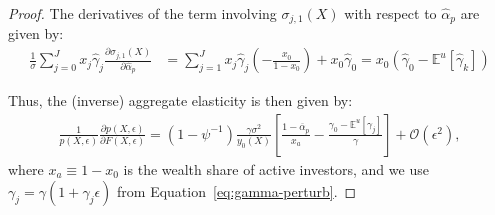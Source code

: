 \begin{proof}
The derivatives of the term involving $ \sigma_{j,1}(X) $ with respect to $ \hat{\alpha}_p $ are given by:
\begin{align}
    \frac{1}{\sigma}  \sum_{j=0}^J x_{j} \hat{\gamma}_j \frac{\partial \sigma_{j,1}(X)}{\partial \hat{\alpha}_p} &=  \sum_{j=1}^J x_j \hat{\gamma}_j \left( -\frac{x_0}{1-x_0} \right)+x_0 \hat{\gamma}_0 = x_0 \left( \hat{\gamma}_0 - \mathbb{E}^u[\hat{\gamma}_k] \right)
\end{align}
 
	Thus, the (inverse) aggregate elasticity is then given by:
	\begin{align}
	\frac{1}{p(X,\epsilon)}\frac{\partial p(X,\epsilon)}{\partial F(X,\epsilon)} =  \left(1-\psi^{-1}\right)\frac{\gamma \sigma^2}{y_0(X)} \left[ \frac{1-\overline{\alpha}_p}{x_a} - \frac{\gamma_0-\mathbb{E}^u\left[\gamma_j \right]}{\gamma}\right]+ \mathcal{O}(\epsilon^2),
	\end{align}
	where $x_a\equiv1-x_0$ is the wealth share of active investors, and we use $ \gamma_{j}=\gamma\left(1+\hat{\gamma}_j\epsilon\right) $ from Equation~\eqref{eq:gamma-perturb}.
\end{proof}

